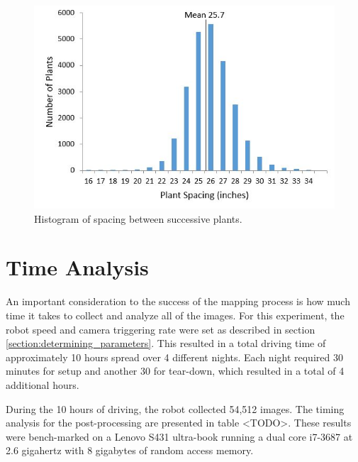 \begin{figure}[htb]
	\centering
    \includegraphics[width=5in]{figures/plant_spacing.jpg}
    \caption[Plant spacing histogram]{Histogram of spacing between successive plants.}
    \label{figure:plant_spacing}
\end{figure}

\section{Time Analysis}

An important consideration to the success of the mapping process is how much time it takes to collect and analyze all of the images. For this experiment, the robot speed and camera triggering rate were set as described in section \ref{section:determining_parameters}.  This resulted in a total driving time of approximately 10 hours spread over 4 different nights.  Each night required 30 minutes for setup and another 30 for tear-down, which resulted in a total of 4 additional hours.  

During the 10 hours of driving, the robot collected 54,512 images.  The timing analysis for the post-processing are presented in table <TODO>. These results were bench-marked on a Lenovo S431 ultra-book running a dual core i7-3687 at 2.6 gigahertz with 8 gigabytes of random access memory.  

